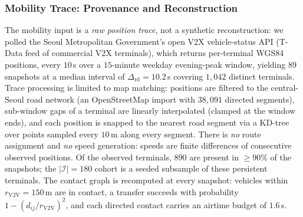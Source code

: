 
\subsubsection{Mobility Trace: Provenance and Reconstruction}
The mobility input is a \emph{raw position trace}, not a synthetic
reconstruction: we polled the Seoul Metropolitan Government's open V2X
vehicle-status API (T-Data feed of commercial V2X terminals), which
returns per-terminal WGS84 positions, every $10$\,s over a $15$-minute
weekday evening-peak window, yielding $89$ snapshots at a median
interval of $\Delta_{\mathrm{rd}}{=}10.2$\,s covering $1{,}042$
distinct terminals. Trace processing is limited to map matching:
positions are filtered to the central-Seoul road network (an
OpenStreetMap import with $38{,}091$ directed segments), sub-window
gaps of a terminal are linearly interpolated (clamped at the window
ends), and each position is snapped to the nearest road segment via a
KD-tree over points sampled every $10$\,m along every segment. There is
\emph{no} route assignment and \emph{no} speed generation: speeds are
finite differences of consecutive observed positions. Of the observed
terminals, $890$ are present in $\ge 90\%$ of the snapshots; the
$|\mathcal I|{=}180$ cohort is a seeded subsample of these persistent
terminals. The contact graph is recomputed at every snapshot: vehicles
within $r_{\mathrm{V2V}}{=}150$\,m are in contact, a transfer succeeds
with probability $1-(d_{ij}/r_{\mathrm{V2V}})^2$, and each directed
contact carries an airtime budget of $1.6$\,s.

